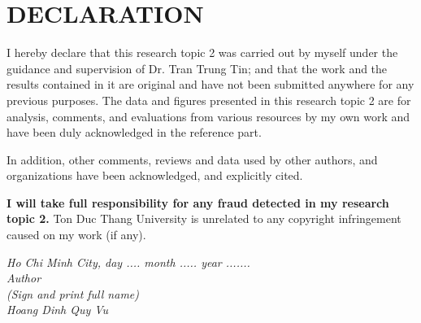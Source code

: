 \chapter*{DECLARATION}
I hereby declare that this research topic 2 was carried out by myself under the guidance and supervision of Dr. Tran Trung Tin; and that the work and the results contained in it are original and have not been submitted anywhere for any previous purposes. The data and figures presented in this research topic 2 are for analysis, comments, and evaluations from various resources by my own work and have been duly acknowledged in the reference part.

In addition, other comments, reviews and data used by other authors, and organizations have been acknowledged, and explicitly cited.

\textbf{I will take full responsibility for any fraud detected in my research topic 2.} Ton Duc Thang University is unrelated to any copyright infringement caused on my work (if any).

\vspace*{1cm}
\begin{flushright}
	\begin{minipage}{8.75cm}
		\centering\itshape
		Ho Chi Minh City, day .... month .....  year .......\\
		Author\\[3cm]
		(Sign and print full name)\\
		Hoang Dinh Quy Vu
	\end{minipage}
\end{flushright}
\newpage